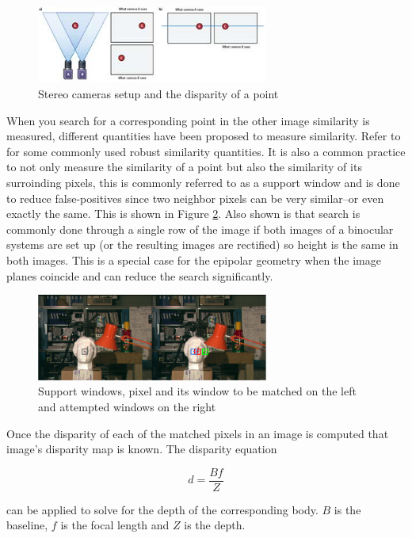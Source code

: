 \documentclass[conference]{IEEEtran}
\begin{document}
\begin{figure}[!t]
	\centering
	\includegraphics[width=3.0in]{stereo_setup}
	\caption{Stereo cameras setup and the disparity of a point}
	\label{fig:stereo_setup}
\end{figure}

When you search for a corresponding point in the other image similarity is measured, different quantities have been proposed to measure similarity. Refer to \cite{hong10} for some commonly used robust similarity quantities. It is also a common practice to not only measure the similarity of a point but also the similarity of its surroinding pixels, this is commonly referred to as a support window and is done to reduce false-positives since two neighbor pixels can be very similar--or even exactly the same. This is shown in Figure \ref{fig:support_windows}. Also shown is that search is commonly done through a single row of the image if both images of a binocular systems are set up (or the resulting images are rectified) so height is the same in both images. This is a special case for the epipolar geometry when the image planes coincide and can reduce the search significantly.

\begin{figure}[!t]
	\centering
	\includegraphics[width=3.0in]{support_windows}
	\caption{Support windows, pixel and its window to be matched on the left and attempted windows on the right}
	\label{fig:support_windows}
\end{figure}

Once the disparity of each of the matched pixels in an image is computed that image's disparity map is known. The disparity equation 

\begin{equation}
\label{eq:disparity}
d = \frac{Bf}{Z}
\end{equation}

can be applied to solve for the depth of the corresponding body. $B$ is the baseline, $f$ is the focal length and $Z$ is the depth.
\end{document}
